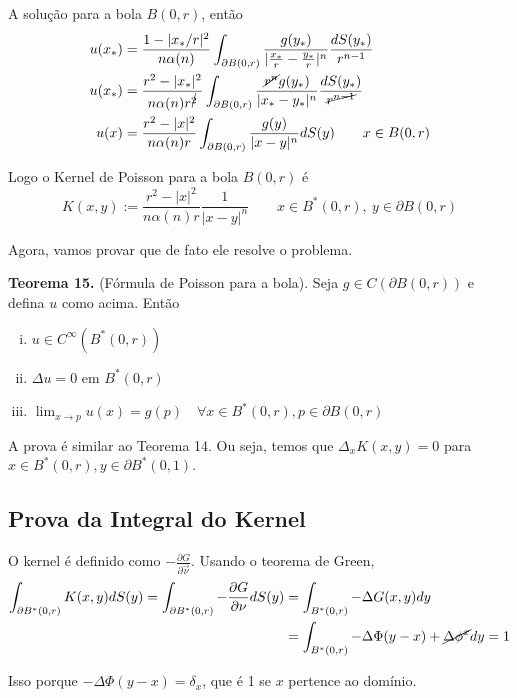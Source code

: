 \documentclass[11pt]{article}
\newcommand{\p}{\partial}
\newcommand{\pde}[2]{\frac{\p #1}{\p #2}}
\begin{document}
A solução para a bola \(B(0,r)\), então
\begin{align*}
	 u(x_*) &= \frac{1 - |x_*/r|^2}{n \alpha(n)} \int_{\p B(0,r)} \frac{g(y_*)}{|\frac{x_*}{r}-\frac{y_*}{r}|^n} \frac{dS(y_*)}{r^{n-1}} \\
	 u(x_*) &= \frac{r^2 - |x_*|^2}{n \alpha(n) r^{\cancel{2}}} \int_{\p B(0,r)} \frac{\cancel{r^n} g(y_*)}{|x_* - y_*|^n} \frac{dS(y_*)}{\cancel{r^{n-1}}} \\
	 u(x) &= \frac{r^2 - |x|^2}{n \alpha(n) r} \int_{\p B(0,r)} \frac{g(y)}{|x-y|^n} dS(y) \qquad x \in B(0,r)
\end{align*}

Logo o Kernel de Poisson para a bola \(B(0,r)\) é
\[ K(x,y) := \frac{r^2 - |x|^2}{n \alpha(n) r} \frac{1}{|x-y|^n} \qquad x \in B^*(0,r), \ y \in \partial B(0,r) \]

Agora, vamos provar que de fato ele resolve o problema.

\textbf{Teorema 15. }(Fórmula de Poisson para a bola). Seja \( g \in C(\p B(0,r)) \) e defina \(u\) como acima. Então
\begin{enumerate}[(i)]
	\item \( u \in C^\infty ( B^*(0,r) ) \)
	\item \( \Delta u = 0 \text{ em } B^*(0,r) \)
	\item \( \lim_{x \rightarrow p} u(x) = g(p) \quad \forall x \in B^*(0,r), p \in \p B(0,r)\)
\end{enumerate}

A prova é similar ao Teorema 14. Ou seja, temos que \(\Delta_x K(x,y) = 0\) para \( x \in B^*(0,r), y \in \p B^*(0,1) \). 

\subsection*{Prova da Integral do Kernel}
O kernel é definido como \( -\pde{G}{\vec{\nu}} \). Usando o teorema de Green, \begin{align*}
	\int_{\partial B^*(0,r)} K(x,y) dS(y) = \int_{\partial B^*(0,r)} -\pde{G}{\nu} dS(y) &= \int_{B^*(0,r)} -\Delta G(x,y) dy \\
	&= \int_{B^*(0,r)} -\Delta \Phi(y-x) + \cancel{\Delta \phi^x} dy = 1
\end{align*}

Isso porque \( -\Delta \Phi(y-x)  = \delta_x \), que é 1 se \(x\) pertence ao domínio.

\vspace{\baselineskip}
\end{document}
